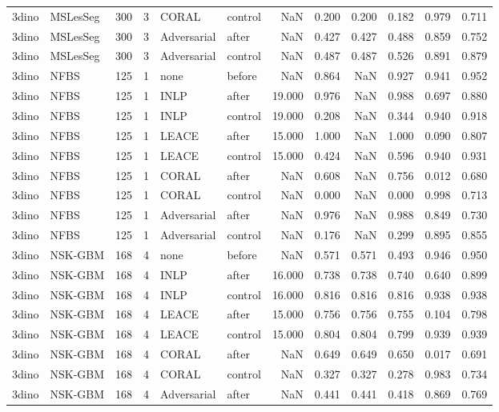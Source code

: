 \begin{tabular}{llrrllrrrrrr}
3dino & MSLesSeg & 300 & 3 & CORAL & control & NaN & 0.200 & 0.200 & 0.182 & 0.979 & 0.711 \\
3dino & MSLesSeg & 300 & 3 & Adversarial & after & NaN & 0.427 & 0.427 & 0.488 & 0.859 & 0.752 \\
3dino & MSLesSeg & 300 & 3 & Adversarial & control & NaN & 0.487 & 0.487 & 0.526 & 0.891 & 0.879 \\
3dino & NFBS & 125 & 1 & none & before & NaN & 0.864 & NaN & 0.927 & 0.941 & 0.952 \\
3dino & NFBS & 125 & 1 & INLP & after & 19.000 & 0.976 & NaN & 0.988 & 0.697 & 0.880 \\
3dino & NFBS & 125 & 1 & INLP & control & 19.000 & 0.208 & NaN & 0.344 & 0.940 & 0.918 \\
3dino & NFBS & 125 & 1 & LEACE & after & 15.000 & 1.000 & NaN & 1.000 & 0.090 & 0.807 \\
3dino & NFBS & 125 & 1 & LEACE & control & 15.000 & 0.424 & NaN & 0.596 & 0.940 & 0.931 \\
3dino & NFBS & 125 & 1 & CORAL & after & NaN & 0.608 & NaN & 0.756 & 0.012 & 0.680 \\
3dino & NFBS & 125 & 1 & CORAL & control & NaN & 0.000 & NaN & 0.000 & 0.998 & 0.713 \\
3dino & NFBS & 125 & 1 & Adversarial & after & NaN & 0.976 & NaN & 0.988 & 0.849 & 0.730 \\
3dino & NFBS & 125 & 1 & Adversarial & control & NaN & 0.176 & NaN & 0.299 & 0.895 & 0.855 \\
3dino & NSK-GBM & 168 & 4 & none & before & NaN & 0.571 & 0.571 & 0.493 & 0.946 & 0.950 \\
3dino & NSK-GBM & 168 & 4 & INLP & after & 16.000 & 0.738 & 0.738 & 0.740 & 0.640 & 0.899 \\
3dino & NSK-GBM & 168 & 4 & INLP & control & 16.000 & 0.816 & 0.816 & 0.816 & 0.938 & 0.938 \\
3dino & NSK-GBM & 168 & 4 & LEACE & after & 15.000 & 0.756 & 0.756 & 0.755 & 0.104 & 0.798 \\
3dino & NSK-GBM & 168 & 4 & LEACE & control & 15.000 & 0.804 & 0.804 & 0.799 & 0.939 & 0.939 \\
3dino & NSK-GBM & 168 & 4 & CORAL & after & NaN & 0.649 & 0.649 & 0.650 & 0.017 & 0.691 \\
3dino & NSK-GBM & 168 & 4 & CORAL & control & NaN & 0.327 & 0.327 & 0.278 & 0.983 & 0.734 \\
3dino & NSK-GBM & 168 & 4 & Adversarial & after & NaN & 0.441 & 0.441 & 0.418 & 0.869 & 0.769 \\

\end{tabular}
